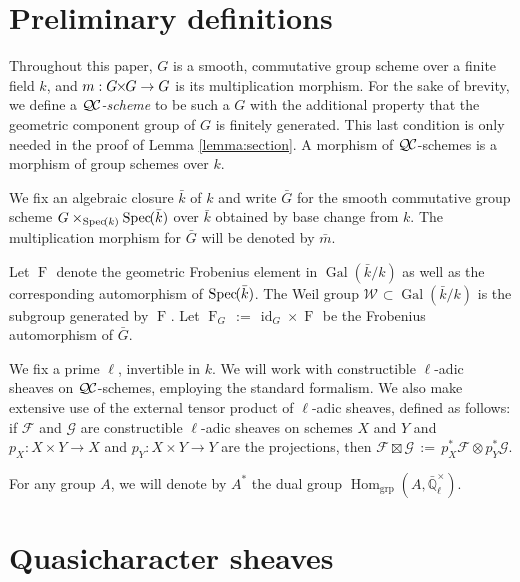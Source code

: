 \documentclass{amsart}
\theoremstyle{plain}
\theoremstyle{definition}
\theoremstyle{remark}
\newcommand{\EE}{\mathbb{\bar Q}_\ell}
\newcommand{\bFq}{\bar{k}}
\newcommand{\Fq}{k}
\newcommand{\EEx}{\EE^\times}
\newcommand{\Weil}[1]{\mathcal{W}_{#1}}
\DeclareMathOperator{\Gal}{Gal}
\newcommand{\Frob}[1]{\operatorname{F}_{#1}}
\DeclareMathOperator{\Hom}{Hom}
\DeclareMathOperator{\id}{id}
\newcommand{\Spec}[1]{{\operatorname{Spec}\hskip-1pt( #1 )}}
\newcommand{\ceq}{{\, :=\, }}
\newcommand{\QC}{{\mathcal{Q\hskip-0.8pt C}}}
\newcommand{\bm}{\bar{m}}
\newcommand{\bG}{\bar{G}}
\newcommand{\tight}[3]{\hspace{-#1pt}{#2}\hspace{-#3pt}}
\newcommand{\GxG}{\text{$G \tight{1}{\times}{1} G$}}
\begin{document}

\tableofcontents

\section{Preliminary definitions}\label{sec:QCschemes}

Throughout this paper, $G$ is a smooth, commutative group scheme
over a finite field $\Fq$, and $m : \GxG\to G$ is its multiplication morphism.  For the sake of brevity, we
define a \emph{$\QC$-scheme} to be such a $G$ with the additional property that the
geometric component group of $G$ is finitely generated.  This last condition is only
needed in the proof of Lemma \ref{lemma:section}.  A morphism of $\QC$-schemes is a morphism
of group schemes over $\Fq$.

We fix an algebraic closure $\bFq$ of $\Fq$ and write $\bG$ for the
smooth commutative group scheme $G \times_{\Spec{\Fq}} \Spec{\bFq}$ over $\bFq$
obtained by base change from $k$. The multiplication morphism for $\bG$ will be denoted by $\bm$.

Let $\Frob{}$ denote the geometric Frobenius element in $\Gal(\bFq/\Fq)$ as
well as the corresponding automorphism of $\Spec{\bFq}$. The Weil group
$\Weil{}\subset \Gal(\bFq/\Fq)$ is the subgroup generated by $\Frob{}$.
Let $\Frob{G} \ceq \id_{G} \times \Frob{}$ be the Frobenius automorphism of $\bG$.

We fix a prime $\ell$, invertible in $\Fq$.
We will work with constructible $\ell$-adic sheaves 
on $\QC$-schemes, employing the standard formalism.
We also make extensive use of the external tensor product of $\ell$-adic sheaves,
defined as follows: if $\mathcal{F}$ and $\mathcal{G}$ are constructible $\ell$-adic
sheaves on schemes $X$ and $Y$ and $p_X : X\times Y\to X$ and $p_Y : X\times Y \to Y$
are the projections, then $\mathcal{F}\boxtimes \mathcal{G} \ceq p_X^* \mathcal{F} \otimes p_Y^*\mathcal{G}$.

For any group $A$, we will denote by $A^*$ the dual group $\Hom_\text{grp}(A, \EEx)$.

\section{Quasicharacter sheaves}\label{sec:category}
\end{document}
